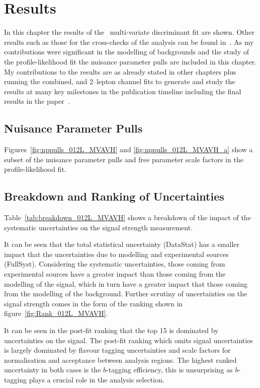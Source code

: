 \chapter{Results}%
\label{ch:results}
In this chapter the results of the \VHbb\ multi-variate discriminant fit are
shown. Other results such as those for the cross-checks of the analysis can be
found in~\cite{VHMainNote2019}. As my contributions were significant in the
modelling of backgrounds and the study of the profile-likelihood fit the
nuisance parameter pulls are included in this chapter. My contributions to the
results are as already stated in other chapters plus running the combined, and
2--lepton channel fits to generate and study the results at many key milestones
in the publication timeline including the final results in the
paper~\cite{final-paper}.

\section{Nuisance Parameter Pulls}


Figures~\ref{fig:nppulls_012L_MVAVH} and \ref{fig:nppulls_012L_MVAVH_a} show a
subset of the nuisance parameter pulls and free parameter scale factors in the
profile-likelihood fit.

\clearpage
\section{Breakdown and Ranking of Uncertainties}
Table~\ref{tab:breakdown_012L_MVAVH} shows a breakdown of the impact of the
systematic uncertainties on the signal strength measurement.

It can be seen that the total statistical uncertainty (DataStat) has a smaller
impact that the uncertainties due to modelling and experimental sources
(FullSyst). Considering the systematic uncertainties, those coming from
experimental sources have a greater impact than those coming from the modelling
of the signal, which in turn have a greater impact  that those coming from the
modelling of the background. Further scrutiny of uncertainties on the signal
strength comes in the form of the ranking shown in
figure~\ref{fig:Rank_012L_MVAVH}.

It can be seen in the post-fit ranking that the top 15 is dominated by
uncertainties on the signal. The post-fit ranking which omits signal
uncertainties is largely dominated by flavour tagging uncertainties and scale
factors for normalisation and acceptance between analysis regions. The highest
ranked uncertainty in both cases is the $b$-tagging efficiency, this is
unsurprising as $b$-tagging plays a crucial role in the analysis selection.

